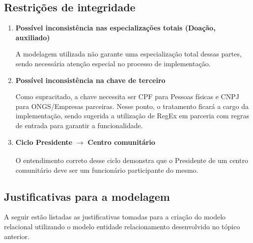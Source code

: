 \subsection{Restrições de integridade}
\begin{enumerate}
    \item \textbf{Possível inconsistência nas especializações totais (Doação, auxiliado)}
    
    A modelagem utilizada não garante uma especialização total dessas partes, sendo necessária atenção especial no processo de implementação.
    \item \textbf{Possível inconsistência na chave de terceiro}
    
    Como supracitado, a chave necessita ser CPF para Pessoas físicas e CNPJ para ONGS/Empresas parceiras. Nesse ponto, o tratamento ficará a cargo da implementação, sendo sugerida a utilização de RegEx em parceria com regras de entrada para garantir a funcionalidade.
    \item \textbf{Ciclo Presidente} $\xrightarrow[]{}$ \textbf{Centro comunitário}
    
    O entendimento correto desse ciclo demonstra que o Presidente de um centro comunitário deve ser um funcionário participante do mesmo.
\end{enumerate}

\subsection{Justificativas para a modelagem}
A seguir estão listadas as justificativas tomadas para a criação do modelo
relacional utilizando o modelo entidade relacionamento desenvolvido no tópico
anterior.

